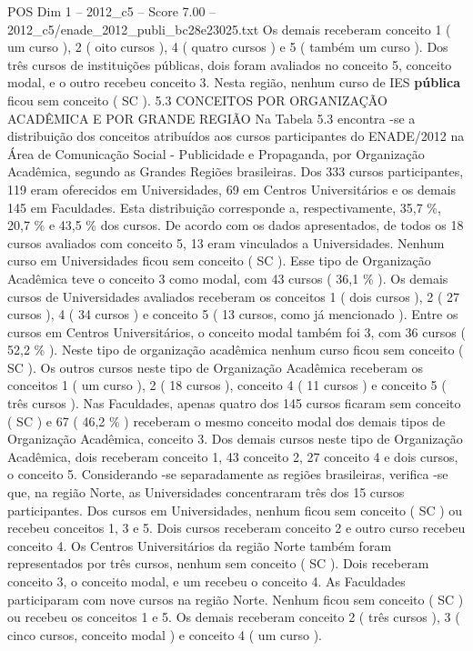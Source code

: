 \begin{textsample}{POS Dim 1 – 2012\_c5 – Score 7.00 – 2012\_c5/enade\_2012\_publi\_bc28e23025.txt}
Os demais receberam conceito 1 ( um curso ), 2 ( oito cursos ), 4 ( quatro cursos ) e 5 ( também um curso ).
Dos três cursos de instituições públicas, dois foram avaliados no conceito 5, conceito modal, e o outro recebeu conceito 3.
Nesta região, nenhum curso de IES \textbf{pública} ficou sem conceito ( SC ). 5.3 CONCEITOS POR ORGANIZAÇÃO ACADÊMICA E POR GRANDE REGIÃO Na Tabela 5.3 encontra -se a distribuição dos conceitos atribuídos aos cursos participantes do ENADE/2012 na Área de Comunicação Social - Publicidade e Propaganda, por Organização Acadêmica, segundo as Grandes Regiões brasileiras.
Dos 333 cursos participantes, 119 eram oferecidos em Universidades, 69 em Centros Universitários e os demais 145 em Faculdades.
Esta distribuição corresponde a, respectivamente, 35,7 \%, 20,7 \% e 43,5 \% dos cursos.
De acordo com os dados apresentados, de todos os 18 cursos avaliados com conceito 5, 13 eram vinculados a Universidades.
Nenhum curso em Universidades ficou sem conceito ( SC ).
Esse tipo de Organização Acadêmica teve o conceito 3 como modal, com 43 cursos ( 36,1 \% ).
Os demais cursos de Universidades avaliados receberam os conceitos 1 ( dois cursos ), 2 ( 27 cursos ), 4 ( 34 cursos ) e conceito 5 ( 13 cursos, como já mencionado ).
Entre os cursos em Centros Universitários, o conceito modal também foi 3, com 36 cursos ( 52,2 \% ).
Neste tipo de organização acadêmica nenhum curso ficou sem conceito ( SC ).
Os outros cursos neste tipo de Organização Acadêmica receberam os conceitos 1 ( um curso ), 2 ( 18 cursos ), conceito 4 ( 11 cursos ) e conceito 5 ( três cursos ).
Nas Faculdades, apenas quatro dos 145 cursos ficaram sem conceito ( SC ) e 67 ( 46,2 \% ) receberam o mesmo conceito modal dos demais tipos de Organização Acadêmica, conceito 3.
Dos demais cursos neste tipo de Organização Acadêmica, dois receberam conceito 1, 43 conceito 2, 27 conceito 4 e dois cursos, o conceito 5.
Considerando -se separadamente as regiões brasileiras, verifica -se que, na região Norte, as Universidades concentraram três dos 15 cursos participantes.
Dos cursos em Universidades, nenhum ficou sem conceito ( SC ) ou recebeu conceitos 1, 3 e 5.
Dois cursos receberam conceito 2 e outro curso recebeu conceito 4.
Os Centros Universitários da região Norte também foram representados por três cursos, nenhum sem conceito ( SC ).
Dois receberam conceito 3, o conceito modal, e um recebeu o conceito 4.
As Faculdades participaram com nove cursos na região Norte.
Nenhum ficou sem conceito ( SC ) ou recebeu os conceitos 1 e 5.
Os demais receberam conceito 2 ( três cursos ), 3 ( cinco cursos, conceito modal ) e conceito 4 ( um curso ).

\end{textsample}
